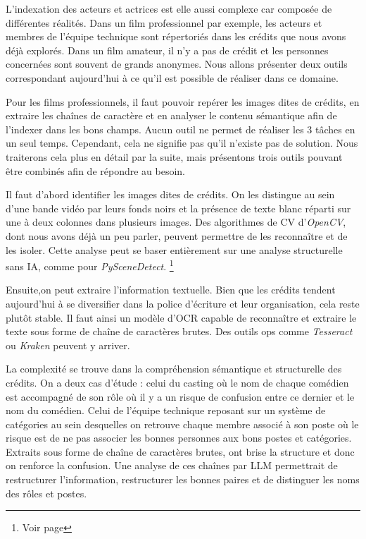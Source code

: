 L'indexation des acteurs et actrices est elle aussi complexe car composée de différentes réalités. Dans un film professionnel par exemple, les acteurs et membres de l'équipe technique sont répertoriés dans les crédits que nous avons déjà explorés. Dans un film amateur, il n'y a pas de crédit et les personnes concernées sont souvent de grands anonymes. Nous allons présenter deux outils correspondant aujourd'hui à ce qu'il est possible de réaliser dans ce domaine.

Pour les films professionnels, il faut pouvoir repérer les images dites de crédits, en extraire les chaînes de caractère et en analyser le contenu sémantique afin de l'indexer dans les bons champs. Aucun outil ne permet de réaliser les 3 tâches en un seul temps. Cependant, cela ne signifie pas qu'il n'existe pas de solution. Nous traiterons cela plus en détail par la suite, mais présentons trois outils pouvant être combinés afin de répondre au besoin. 

Il faut d'abord identifier les images dites de crédits. On les distingue au sein d'une bande vidéo par leurs fonds noirs et la présence de texte blanc réparti sur une à deux colonnes dans plusieurs images. Des algorithmes de \gls{CV} d'\textit{OpenCV}, dont nous avons déjà un peu parler, peuvent permettre de les reconnaître et de les isoler. Cette analyse peut se baser entièrement sur une analyse structurelle sans \gls{IA}, comme pour \textit{PySceneDetect}. \footnote{Voir page \pageref{detecteurs}}\newline

Ensuite,on peut extraire l’information textuelle. Bien que les crédits tendent aujourd'hui à se diversifier dans la police d'écriture et leur organisation, cela reste plutôt stable. Il faut ainsi un modèle d'\gls{OCR} capable de reconnaître et extraire le texte sous forme de chaîne de caractères brutes. Des outils \gls{ops} comme \textit{Tesseract} ou \textit{Kraken} peuvent y arriver. 

La complexité se trouve dans la compréhension sémantique et structurelle des crédits. On a deux cas d'étude : celui du casting où le nom de chaque comédien est accompagné de son rôle où il y a un risque de confusion entre ce dernier et le nom du comédien. Celui de l'équipe technique reposant sur un système de catégories au sein desquelles on retrouve chaque membre associé à son poste où le risque est de ne pas associer les bonnes personnes aux bons postes et catégories. Extraits sous forme de chaîne de caractères brutes, ont brise la structure et donc on renforce la confusion. Une analyse de ces chaînes par \gls{LLM} permettrait de restructurer l'information, restructurer les bonnes paires et de distinguer les noms des rôles et postes.\newline


